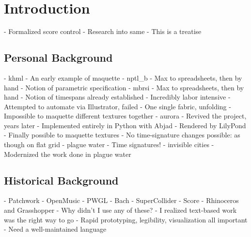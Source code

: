 \chapter{Introduction}
\label{chap:introduction}

\begin{markdown}
-   Formalized score control
-   Research into same
-   This is a treatise
\end{markdown}

\section{Personal Background}

\begin{markdown}
-   khml
    -   An early example of maquette
-   nptl_b
    -   Max to spreadsheets, then by hand
    -   Notion of parametric specification
-   mbrsi
    -   Max to spreadsheets, then by hand
    -   Notion of timespans already established
    -   Incredibly labor intensive
    -   Attempted to automate via Illustrator, failed
    -   One single fabric, unfolding
    -   Impossible to maquette different textures together
-   aurora
    -   Revived the project, years later
    -   Implemented entirely in Python with Abjad
    -   Rendered by LilyPond
    -   Finally possible to maquette textures
    -   No time-signature changes possible: as though on flat grid
-   plague water
    -   Time signatures!
-   invisible cities
    -   Modernized the work done in plague water
\end{markdown}

\section{Historical Background}

\begin{markdown}
-   Patchwork
-   OpenMusic
-   PWGL
-   Bach
-   SuperCollider
-   Score
-   Rhinoceros and Grasshopper
-   Why didn't I use any of these?
    -   I realized text-based work was the right way to go
    -   Rapid prototyping, legibility, visualization all important
    -   Need a well-maintained language
\end{markdown}

